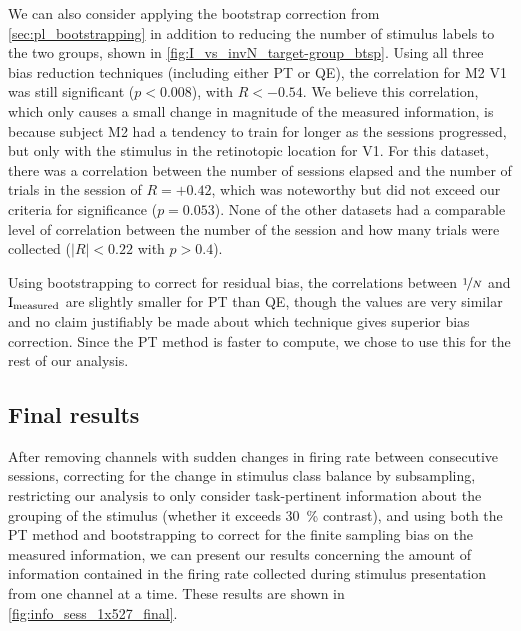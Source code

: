 
We can also consider applying the bootstrap correction from \autoref{sec:pl_bootstrapping} in addition to reducing the number of stimulus labels to the two groups, shown in \autoref{fig:I_vs_invN_target-group_btsp}.
Using all three bias reduction techniques (including either \ac{PT} or \ac{QE}), the correlation for \ac{M2} \ac{V1} was still significant ($p < 0.008$), with $R<-0.54$.
We believe this correlation, which only causes a small change in magnitude of the measured information, is because subject \ac{M2} had a tendency to train for longer as the sessions progressed, but only with the stimulus in the retinotopic location for \ac{V1}.
For this dataset, there was a correlation between the number of sessions elapsed and the number of trials in the session of $R=+0.42$, which was noteworthy but did not exceed our criteria for significance ($p=0.053$).
None of the other datasets had a comparable level of correlation between the number of the session and how many trials were collected ($|R|<0.22$ with $p > 0.4$).

Using bootstrapping to correct for residual bias, the correlations between $\nicefrac{1}{N}$ and $\operatorname{I}_\text{measured}$ are slightly smaller for \ac{PT} than \ac{QE}, though the values are very similar and no claim justifiably be made about which technique gives superior bias correction.
Since the \ac{PT} method is faster to compute, we chose to use this for the rest of our analysis.


\subsection{Final results}
\label{sec:pl_initial_final}

After removing channels with sudden changes in firing rate between consecutive sessions, correcting for the change in stimulus class balance by subsampling, restricting our analysis to only consider task-pertinent information about the grouping of the stimulus (whether it exceeds \SI{30}{\percent} contrast), and using both the \ac{PT} method and bootstrapping to correct for the finite sampling bias on the measured information, we can present our results concerning the amount of information contained in the firing rate collected during stimulus presentation from one channel at a time.
These results are shown in \autoref{fig:info_sess_1x527_final}.


